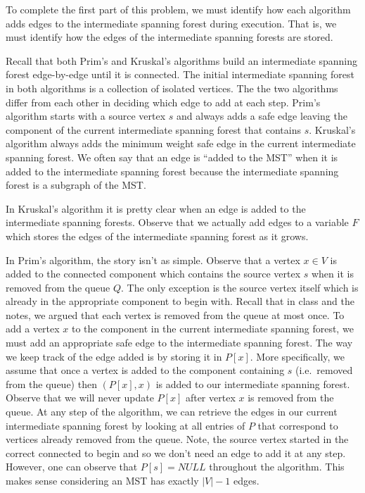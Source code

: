 \documentclass[12pt,letterpaper]{article}
\theoremstyle{definition}
\begin{document}
To complete the first part of this problem, we must identify how each algorithm adds edges to the intermediate spanning forest during execution.
That is, we must identify how the edges of the intermediate spanning forests are stored.

Recall that both Prim's and Kruskal's algorithms build an intermediate spanning forest edge-by-edge until it is connected.
The initial intermediate spanning forest in both algorithms is a collection of isolated vertices.
The the two algorithms differ from each other in deciding which edge to add at each step.
Prim's algorithm starts with a source vertex $s$ and always adds a safe edge leaving the component of the current intermediate spanning forest that contains $s$.
Kruskal's algorithm always adds the minimum weight safe edge in the current intermediate spanning forest.
We often say that an edge is ``added to the MST'' when it is added to the intermediate spanning forest because the intermediate spanning forest is a subgraph of the MST. 

In Kruskal's algorithm it is pretty clear when an edge is added to the intermediate spanning forests. 
Observe that we actually add edges to a variable $F$ which stores the edges of the intermediate spanning forest as it grows.

In Prim's algorithm, the story isn't as simple.
Observe that a vertex $x \in V$ is added to the connected component which contains the source vertex $s$ when it is removed from the queue $Q$.
The only exception is the source vertex itself which is already in the appropriate component to begin with. 
Recall that in class and the notes, we argued that each vertex is removed from the queue at most once.
To add a vertex $x$ to the component in the current intermediate spanning forest, we must add an appropriate safe edge to the intermediate spanning forest.
The way we keep track of the edge added is by storing it in $P[x]$. 
More specifically, we assume that once a vertex is added to the component containing $s$ (i.e.\ removed from the queue) then $(P[x], x)$ is added to our intermediate spanning forest.
Observe that we will never update $P[x]$ after vertex $x$ is removed from the queue. 
At any step of the algorithm, we can retrieve the edges in our current intermediate spanning forest by looking at all entries of $P$ that correspond to vertices already removed from the queue.
Note, the source vertex started in the correct connected to begin and so we don't need an edge to add it at any step.
However, one can observe that $P[s] = NULL$ throughout the algorithm. 
This makes sense considering an MST has exactly $|V|-1$ edges. 
\end{document}
